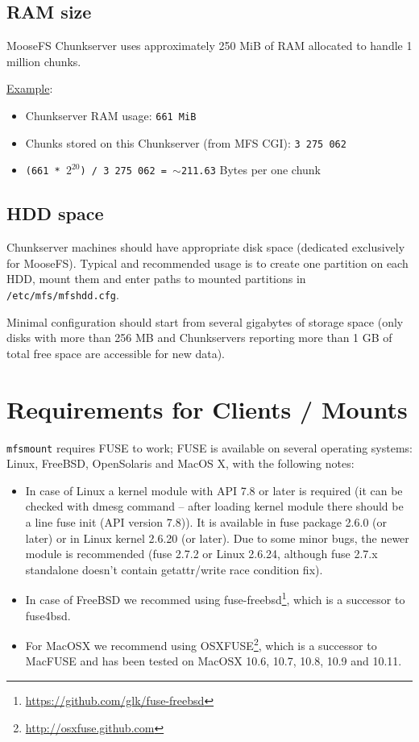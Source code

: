 \documentclass[a4paper,11pt,english]{report}
\def\code#1{\texttt{#1}}
\begin{document}
			\subsection{RAM size}
			MooseFS Chunkserver uses approximately 250 MiB of RAM allocated to handle 1 million chunks.
			
			\underline{Example}:
			\begin{itemize}
				\item Chunkserver RAM usage: \code{661 MiB}
				\item Chunks stored on this Chunkserver (from MFS CGI): \code{3 275 062}
				\item \code{(661 * $2^{20}$) / 3 275 062 = $\sim$211.63} Bytes per one chunk
			\end{itemize}
			
			\subsection{HDD space}
			Chunkserver machines should have appropriate disk space (dedicated exclusively for MooseFS). Typical and recommended usage is to create one partition on each HDD, mount them and enter paths to mounted partitions in \code{/etc/mfs/mfshdd.cfg}.
		
			Minimal configuration should start from several gigabytes of storage space (only disks with more than 256 MB and Chunkservers reporting more than 1 GB of total free space are accessible for new data).

		\section{Requirements for Clients / Mounts}
		\code{mfsmount} requires FUSE to work; FUSE is available on several operating systems: Linux, FreeBSD, OpenSolaris and MacOS X, with the following notes:
		
		\begin{itemize}
			\item In case of Linux a kernel module with API 7.8 or later is required (it can be checked with dmesg command -- after loading kernel module there should be a line fuse init (API version 7.8)). It is available in fuse package 2.6.0 (or later) or in Linux kernel 2.6.20 (or later). Due to some minor bugs, the newer module is recommended (fuse 2.7.2 or Linux 2.6.24, although fuse 2.7.x standalone doesn't contain getattr/write race condition fix).
			\item In case of FreeBSD we recommed using fuse-freebsd\footnote{\url{https://github.com/glk/fuse-freebsd}}, which is a successor to fuse4bsd.
			\item For MacOSX we recommend using OSXFUSE\footnote{\url{http://osxfuse.github.com}}, which is a successor to MacFUSE and has been tested on MacOSX 10.6, 10.7, 10.8, 10.9 and 10.11.
		\end{itemize}
\end{document}
